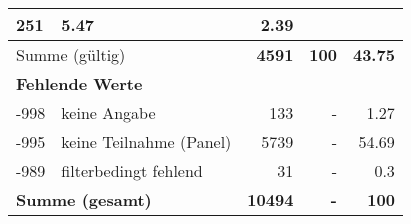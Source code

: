 \begin{longtable}{lXrrr}
       \num{251} &
       \num[round-mode=places,round-precision=2]{5.47} &
         \num[round-mode=places,round-precision=2]{2.39} \\
     \midrule
     \multicolumn{2}{l}{Summe (gültig)} &
       \textbf{\num{4591}} &
     \textbf{\num{100}} &
       \textbf{\num[round-mode=places,round-precision=2]{43.75}} \\
     \multicolumn{5}{l}{\textbf{Fehlende Werte}}\\
       -998 &
       keine Angabe &
         \num{133} &
        - &
         \num[round-mode=places,round-precision=2]{1.27} \\
       -995 &
       keine Teilnahme (Panel) &
         \num{5739} &
        - &
         \num[round-mode=places,round-precision=2]{54.69} \\
       -989 &
       filterbedingt fehlend &
         \num{31} &
        - &
         \num[round-mode=places,round-precision=2]{0.3} \\
     \midrule
     \multicolumn{2}{l}{\textbf{Summe (gesamt)}} &
          \textbf{\num{10494}} &
        \textbf{-} &
        \textbf{\num{100}} \\
     \bottomrule
     \end{longtable}
     
